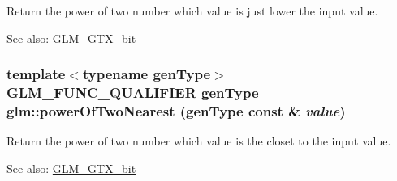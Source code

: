 Return the power of two number which value is just lower the input value. \begin{Desc}
\item[See also:]\hyperlink{group__gtx__bit}{GLM\_\-GTX\_\-bit} \end{Desc}
\hypertarget{group__gtx__bit_g0e3c8f921e59dc07ad9c70bb1376799c}{
\subsubsection[powerOfTwoNearest]{\setlength{\rightskip}{0pt plus 5cm}template$<$typename genType$>$ GLM\_\-FUNC\_\-QUALIFIER genType glm::powerOfTwoNearest (genType const \& {\em value})}}
\label{group__gtx__bit_g0e3c8f921e59dc07ad9c70bb1376799c}


Return the power of two number which value is the closet to the input value. \begin{Desc}
\item[See also:]\hyperlink{group__gtx__bit}{GLM\_\-GTX\_\-bit} \end{Desc}
